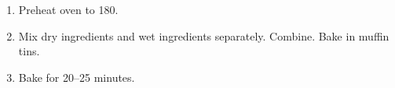 
\begin{ingredients}
\end{ingredients}


\begin{recipe}
  \begin{enumerate}

  \item Preheat oven to 180\degreeC.

  \item Mix dry ingredients and wet ingredients separately.  Combine.
  Bake in muffin tins.

  \item Bake for 20--25 minutes.

  \end{enumerate}
\end{recipe}
